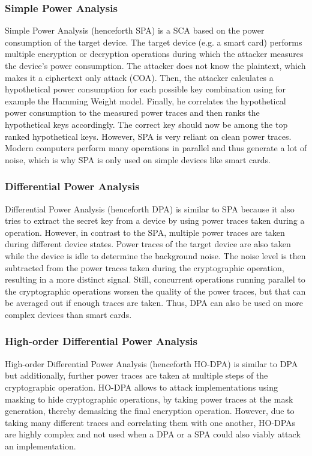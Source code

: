 \documentclass[journal]{IEEEtran}
\begin{document}
\subsubsection{Simple Power Analysis}
Simple Power Analysis (henceforth SPA) is a SCA based on the power consumption of the target device. The target device (e.g. a smart card) performs multiple encryption or decryption operations during which the attacker measures the device's power consumption. The attacker does not know the plaintext, which makes it a ciphertext only attack (COA). Then, the attacker calculates a hypothetical power consumption for each possible key combination using for example the Hamming Weight model. Finally, he correlates the hypothetical power consumption to the measured power traces and then ranks the hypothetical keys accordingly. The correct key should now be among the top ranked hypothetical keys. However, SPA is very reliant on clean power traces. Modern computers perform many operations in parallel and thus generate a lot of noise, which is why SPA is only used on simple devices like smart cards. 

\subsubsection{Differential Power Analysis}
Differential Power Analysis (henceforth DPA) is similar to SPA because it also tries to extract the secret key from a device by using power traces taken during a operation. However, in contrast to the SPA, multiple power traces are taken during different device states. Power traces of the target device are also taken while the device is idle to determine the background noise. The noise level is then subtracted from the power traces taken during the cryptographic operation, resulting in a more distinct signal. Still, concurrent operations running parallel to the cryptographic operations worsen the quality of the power traces, but that can be averaged out if enough traces are taken. Thus, DPA can also be used on more complex devices than smart cards.

\subsubsection{High-order Differential Power Analysis}
High-order Differential Power Analysis (henceforth HO-DPA) is similar to DPA but additionally, further power traces are taken at multiple steps of the cryptographic operation. HO-DPA allows to attack implementations using masking to hide cryptographic operations, by taking power traces at the mask generation, thereby demasking the final encryption operation. However, due to taking many different traces and correlating them with one another, HO-DPAs are highly complex and not used when a DPA or a SPA could also viably attack an implementation.
\end{document}
